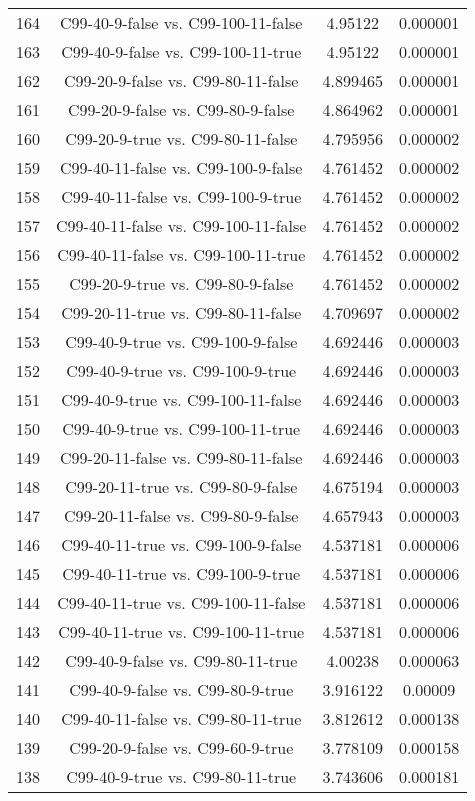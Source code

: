 \documentclass[a4paper,10pt]{article}
\begin{document}
\begin{landscape}
\begin{table}[!htp]
\begin{tabular}{cccc}
164&C99-40-9-false vs. C99-100-11-false&4.95122&0.000001\\
163&C99-40-9-false vs. C99-100-11-true&4.95122&0.000001\\
162&C99-20-9-false vs. C99-80-11-false&4.899465&0.000001\\
161&C99-20-9-false vs. C99-80-9-false&4.864962&0.000001\\
160&C99-20-9-true vs. C99-80-11-false&4.795956&0.000002\\
159&C99-40-11-false vs. C99-100-9-false&4.761452&0.000002\\
158&C99-40-11-false vs. C99-100-9-true&4.761452&0.000002\\
157&C99-40-11-false vs. C99-100-11-false&4.761452&0.000002\\
156&C99-40-11-false vs. C99-100-11-true&4.761452&0.000002\\
155&C99-20-9-true vs. C99-80-9-false&4.761452&0.000002\\
154&C99-20-11-true vs. C99-80-11-false&4.709697&0.000002\\
153&C99-40-9-true vs. C99-100-9-false&4.692446&0.000003\\
152&C99-40-9-true vs. C99-100-9-true&4.692446&0.000003\\
151&C99-40-9-true vs. C99-100-11-false&4.692446&0.000003\\
150&C99-40-9-true vs. C99-100-11-true&4.692446&0.000003\\
149&C99-20-11-false vs. C99-80-11-false&4.692446&0.000003\\
148&C99-20-11-true vs. C99-80-9-false&4.675194&0.000003\\
147&C99-20-11-false vs. C99-80-9-false&4.657943&0.000003\\
146&C99-40-11-true vs. C99-100-9-false&4.537181&0.000006\\
145&C99-40-11-true vs. C99-100-9-true&4.537181&0.000006\\
144&C99-40-11-true vs. C99-100-11-false&4.537181&0.000006\\
143&C99-40-11-true vs. C99-100-11-true&4.537181&0.000006\\
142&C99-40-9-false vs. C99-80-11-true&4.00238&0.000063\\
141&C99-40-9-false vs. C99-80-9-true&3.916122&0.00009\\
140&C99-40-11-false vs. C99-80-11-true&3.812612&0.000138\\
139&C99-20-9-false vs. C99-60-9-true&3.778109&0.000158\\
138&C99-40-9-true vs. C99-80-11-true&3.743606&0.000181\\

\end{tabular}
\end{table}
\end{landscape}
\end{document}
